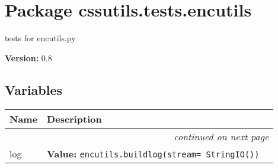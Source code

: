 %
%
%


\section{Package cssutils.tests.encutils}

    \label{cssutils:tests:encutils}
tests for encutils.py

\textbf{Version:} 0.8





  \subsection{Variables}

    \vspace{-1cm}
\hspace{\varindent}\begin{longtable}{|p{\varnamewidth}|p{\vardescrwidth}|l}
\cline{1-2}
\cline{1-2} \centering \textbf{Name} & \centering \textbf{Description}& \\
\cline{1-2}
\endhead\cline{1-2}\multicolumn{3}{r}{\small\textit{continued on next page}}\\\endfoot\cline{1-2}
\endlastfoot\raggedright l\-o\-g\- & \raggedright \textbf{Value:} 
{\tt encutils.buildlog(stream= StringIO())}&\\
\cline{1-2}
\end{longtable}



